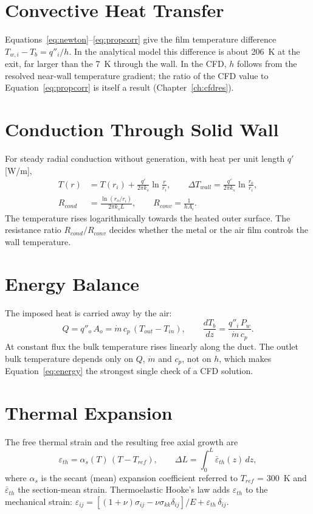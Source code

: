 \section{Convective Heat Transfer}
Equations~\eqref{eq:newton}--\eqref{eq:propcorr} give the film temperature difference $T_{w,i} - T_b = q''_i/h$. In the analytical model this
difference is about 206~K at the exit, far larger than the 7~K through the wall. In the CFD, $h$ follows from the resolved near-wall
temperature gradient; the ratio of the CFD value to Equation~\eqref{eq:propcorr} is itself a result (Chapter~\ref{ch:cfdres}).

\section{Conduction Through Solid Wall}
For steady radial conduction without generation, with heat per unit length $q'$ [W/m],
\begin{align}
T(r) &= T(r_i) + \frac{q'}{2\pi k_s}\ln\frac{r}{r_i}, \qquad \Delta T_{wall} = \frac{q'}{2\pi k_s}\ln\frac{r_o}{r_i}, \label{eq:fourier}\\
R_{cond} &= \frac{\ln(r_o/r_i)}{2\pi k_s L}, \qquad R_{conv} = \frac{1}{h A_i}. \label{eq:resist}
\end{align}
The temperature rises logarithmically towards the heated outer surface. The resistance ratio $R_{cond}/R_{conv}$ decides whether the metal
or the air film controls the wall temperature.

\section{Energy Balance}
The imposed heat is carried away by the air:
\begin{equation}
Q = q''_o\,A_o = \dot m\,c_p\,(T_{out} - T_{in}), \qquad \frac{dT_b}{dz} = \frac{q''_i\,P_w}{\dot m\,c_p} .
\label{eq:energy}
\end{equation}
At constant flux the bulk temperature rises linearly along the duct. The outlet bulk temperature depends only on $Q$, $\dot m$ and $c_p$,
not on $h$, which makes Equation~\eqref{eq:energy} the strongest single check of a CFD solution.

\section{Thermal Expansion}
The free thermal strain and the resulting free axial growth are
\begin{equation}
\varepsilon_{th} = \alpha_s(T)\,\left(T - T_{ref}\right), \qquad \Delta L = \int_0^L \bar\varepsilon_{th}(z)\,dz ,
\label{eq:thermalstrain}
\end{equation}
where $\alpha_s$ is the secant (mean) expansion coefficient referred to $T_{ref}$ = 300~K and $\bar\varepsilon_{th}$ the section-mean
strain. Thermoelastic Hooke's law adds $\varepsilon_{th}$ to the mechanical strain:
$\varepsilon_{ij} = \left[(1+\nu)\sigma_{ij} - \nu\sigma_{kk}\delta_{ij}\right]/E + \varepsilon_{th}\,\delta_{ij}$.

